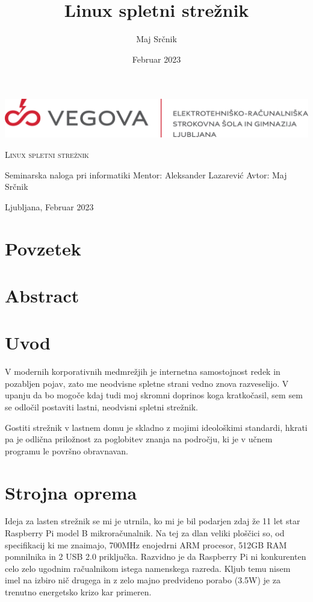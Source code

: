 \documentclass[12pt, a4paper]{article}
\title{Linux spletni strežnik}
\author{Maj Srčnik}
\date{Februar 2023}
\affil{Vegova Ljubljana}
\begin{document}
\begin{titlepage}
	\begin{center}
		\includegraphics[width=\textwidth]{slike/logotip_vegova_leze_brezokvirja.png}\par\vspace{6cm}
		{\scshape\huge Linux spletni strežnik}\par
		\large{Seminarska naloga pri informatiki}
		\vfill
		Mentor: Aleksander Lazarević \hfill Avtor: Maj Srčnik\par\vspace{1cm}
		Ljubljana, Februar 2023
	\end{center}
\end{titlepage}
\thispagestyle{empty}
\pagebreak
\tableofcontents
\pagebreak
\thispagestyle{empty}
\section*{Povzetek}
\section*{Abstract}
\pagebreak
\section{Uvod}
V modernih korporativnih medmrežjih je internetna samostojnost redek in pozabljen pojav, zato me neodvisne spletne strani vedno znova razveselijo.
V upanju da bo mogoče kdaj tudi moj skromni doprinos koga kratkočasil, sem sem se odločil postaviti lastni, neodvisni spletni strežnik.

Gostiti strežnik v lastnem domu je skladno z mojimi ideološkimi standardi, hkrati pa je odlična priložnost za poglobitev znanja na področju, ki je v učnem programu le površno obravnavan.

\section{Strojna oprema}
Ideja za lasten strežnik se mi je utrnila, ko mi je bil podarjen zdaj že 11 let star Raspberry Pi model B mikroračunalnik.
Na tej za dlan veliki ploščici so, od specifikacij ki me znaimajo, 700MHz enojedrni ARM procesor, 512GB RAM pomnilnika in 2 USB 2.0 priključka.
Razvidno je da Raspberry Pi ni konkurenten celo zelo ugodnim račualnikom istega namenskega razreda.
Kljub temu nisem imel na izbiro nič drugega in z zelo majno predvideno porabo (3.5W) je za trenutno energetsko krizo kar primeren.
\end{document}
